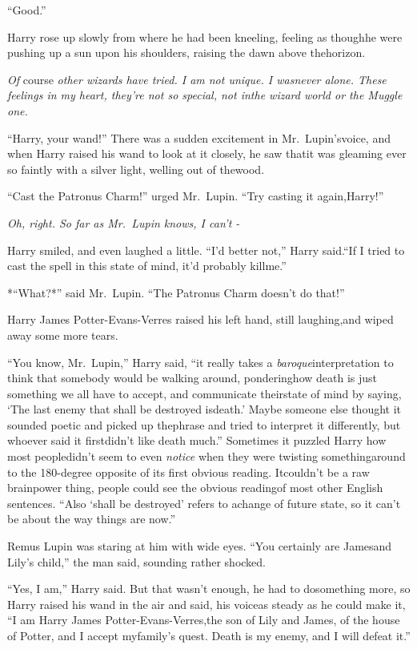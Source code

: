 ``Good.''

Harry rose up slowly from where he had been kneeling, feeling as thoughhe were pushing up a sun upon his shoulders, raising the dawn above thehorizon. \emph{\\}

\emph{Of} course \emph{other wizards have tried. I am not unique. I wasnever alone. These feelings in my heart, they're not so special, not inthe wizard world or the Muggle one.}

``Harry, your wand!'' There was a sudden excitement in Mr.~Lupin'svoice, and when Harry raised his wand to look at it closely, he saw thatit was gleaming ever so faintly with a silver light, welling out of thewood.

``Cast the Patronus Charm!'' urged Mr.~Lupin. ``Try casting it again,Harry!''

\emph{Oh, right. So far as Mr.~Lupin knows, I can't -}

Harry smiled, and even laughed a little. ``I'd better not,'' Harry said.``If I tried to cast the spell in this state of mind, it'd probably killme.''

*``What?*'' said Mr.~Lupin. ``The Patronus Charm doesn't do that!''

Harry James Potter-Evans-Verres raised his left hand, still laughing,and wiped away some more tears.

``You know, Mr.~Lupin,'' Harry said, ``it really takes a \emph{baroque}interpretation to think that somebody would be walking around, ponderinghow death is just something we all have to accept, and communicate theirstate of mind by saying, `The last enemy that shall be destroyed isdeath.' Maybe someone else thought it sounded poetic and picked up thephrase and tried to interpret it differently, but whoever said it firstdidn't like death much.'' Sometimes it puzzled Harry how most peopledidn't seem to even \emph{notice} when they were twisting somethingaround to the 180-degree opposite of its first obvious reading. Itcouldn't be a raw brainpower thing, people could see the obvious readingof most other English sentences. ``Also `shall be destroyed' refers to achange of future state, so it can't be about the way things are now.''

Remus Lupin was staring at him with wide eyes. ``You certainly are Jamesand Lily's child,'' the man said, sounding rather shocked.

``Yes, I am,'' Harry said. But that wasn't enough, he had to dosomething more, so Harry raised his wand in the air and said, his voiceas steady as he could make it, ``I am Harry James Potter-Evans-Verres,the son of Lily and James, of the house of Potter, and I accept myfamily's quest. Death is my enemy, and I will defeat it.''

